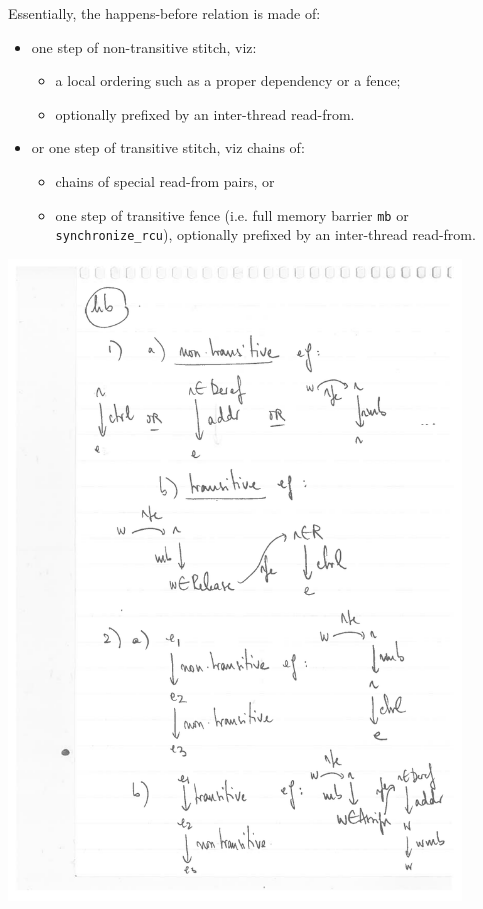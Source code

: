 \documentclass[a4paper]{article}
\begin{document}
Essentially, the happens-before relation is made of:
\begin{itemize}
\item one step of non-transitive stitch, viz:
  \begin{itemize}
  \item a local ordering such as a proper dependency or a fence;
  \item optionally prefixed by an inter-thread read-from.
  \end{itemize}
\item or one step of transitive stitch, viz chains of:
  \begin{itemize}
  \item chains of special read-from pairs, or
  \item one step of transitive fence (i.e. full memory barrier {\tt mb} or {\tt
synchronize\_rcu}), optionally prefixed by an inter-thread read-from.
  \end{itemize}
\end{itemize}

\includegraphics[width=12cm]{hb}
\end{document}

